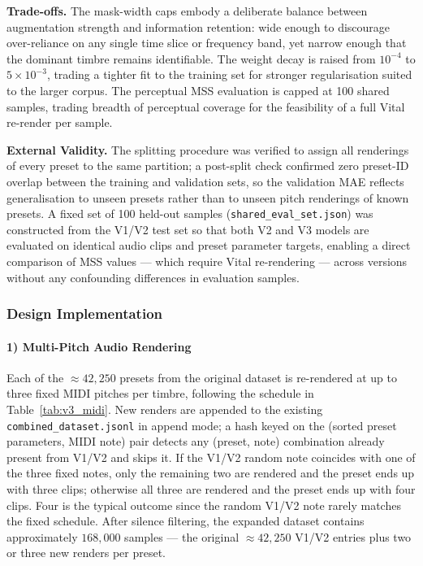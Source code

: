 \par \vspace{0.3cm}
\noindent\textbf{Trade-offs.} The mask-width caps embody a deliberate balance between augmentation strength and information retention: wide enough to discourage over-reliance on any single time slice or frequency band, yet narrow enough that the dominant timbre remains identifiable. The weight decay is raised from $10^{-4}$ to $5\times10^{-3}$, trading a tighter fit to the training set for stronger regularisation suited to the larger corpus. The perceptual MSS evaluation is capped at 100 shared samples, trading breadth of perceptual coverage for the feasibility of a full Vital re-render per sample.

\par \vspace{0.3cm}
\noindent\textbf{External Validity.} The splitting procedure was verified to assign all renderings of every preset to the same partition; a post-split check confirmed zero preset-ID overlap between the training and validation sets, so the validation MAE reflects generalisation to unseen presets rather than to unseen pitch renderings of known presets. A fixed set of 100 held-out samples (\texttt{shared\_eval\_set.json}) was constructed from the V1/V2 test set so that both V2 and V3 models are evaluated on identical audio clips and preset parameter targets, enabling a direct comparison of MSS values — which require Vital re-rendering — across versions without any confounding differences in evaluation samples.

\subsubsection{Design Implementation}

\paragraph{1) Multi-Pitch Audio Rendering}
Each of the $\approx 42{,}250$ presets from the original dataset is re-rendered at up to three fixed MIDI pitches per timbre, following the schedule in Table~\ref{tab:v3_midi}. New renders are appended to the existing \texttt{combined\_dataset.jsonl} in append mode; a hash keyed on the (sorted preset parameters, MIDI note) pair detects any (preset, note) combination already present from V1/V2 and skips it. If the V1/V2 random note coincides with one of the three fixed notes, only the remaining two are rendered and the preset ends up with three clips; otherwise all three are rendered and the preset ends up with four clips. Four is the typical outcome since the random V1/V2 note rarely matches the fixed schedule. After silence filtering, the expanded dataset contains approximately $168{,}000$ samples — the original $\approx 42{,}250$ V1/V2 entries plus two or three new renders per preset.

